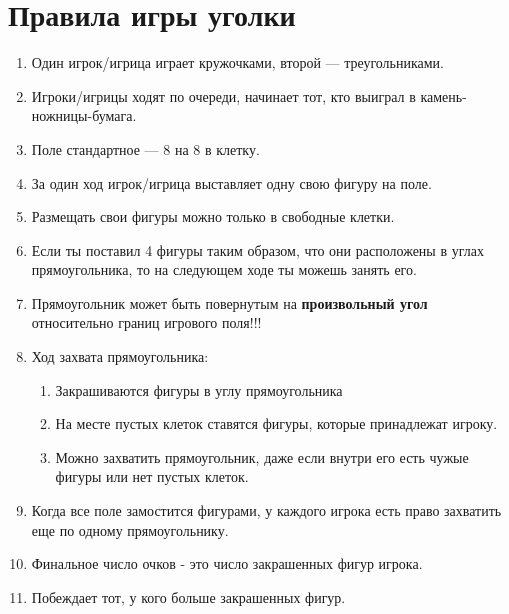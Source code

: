 \documentclass[11pt]{article} %
\begin{document}
\section*{Правила игры уголки}
\begin{enumerate}
    \item Один игрок/игрица играет кружочками, второй — треугольниками. 
    \item Игроки/игрицы ходят по очереди, начинает тот, кто выиграл в камень-ножницы-бумага. 
    \item Поле стандартное — 8 на 8 в клетку. 
    \item За один ход игрок/игрица выставляет одну свою фигуру на поле. 
    \item Размещать свои фигуры можно только в свободные клетки.
    \item Если ты поставил 4 фигуры таким образом, что они расположены в углах прямоугольника, то на следующем ходе ты можешь занять его.
    \item Прямоугольник может быть повернутым на \textbf{произвольный угол} относительно границ игрового поля!!!
    \item Ход захвата прямоугольника: \begin{enumerate}
        \item Закрашиваются фигуры в углу прямоугольника
        \item На месте пустых клеток ставятся фигуры, которые принадлежат игроку.
        \item  Можно захватить прямоугольник, даже если внутри его есть чужые фигуры или нет пустых клеток.
    \end{enumerate}
    \item Когда все поле замостится фигурами, у каждого игрока есть право захватить еще по одному прямоугольнику.
    \item Финальное число очков - это число закрашенных фигур игрока.
    \item Побеждает тот, у кого больше закрашенных фигур.
\end{enumerate}
\end{document}
